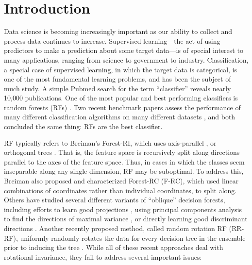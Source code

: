 \documentclass{article}
\begin{document}
\section{Introduction}
Data science is becoming increasingly important as our ability to collect and process data continues to increase. Supervised learning---the act of using predictors to make a prediction about some target data---is of special interest to many applications, ranging from science to government to industry. Classification, a special case of supervised learning, in which the target data is categorical, is one of the most fundamental learning problems, and has been the subject of much study. A simple Pubmed search for the term ``classifier'' reveals nearly 10,000 publications. One of the most popular and best performing classifiers is random forests (RFs) \cite{Breiman2001}. Two recent benchmark papers assess the performance of many different classification algorithms on many different datasets \cite{Delgado2014,Caruana2008}, and both concluded the same thing: RFs are the best classifier.


RF typically refers to Breiman's Forest-RI, which uses axis-parallel \cite{Heath1993}, or orthogonal trees \cite{Menze2011}. That is, the feature space is recursively split along directions parallel to the axes of the feature space. Thus, in cases in which the classes seem inseparable along any single dimension, RF may be suboptimal. To address this, Breiman also proposed and characterized Forest-RC (F-RC), which used linear combinations of coordinates rather than individual coordinates, to split along. Others have studied several different variants of ``oblique'' decision forests, including efforts to learn good projections \cite{Heath1993,Tan2005}, using principal components analysis to find the directions of maximal variance \cite{Ho1998,Rodriguez2006}, or directly learning good discriminant directions \cite{Menze2011}. Another recently proposed method, called random rotation RF (RR-RF), uniformly randomly rotates the data for every decision tree in the ensemble prior to inducing the tree \cite{Blaser2016}. While all of these recent approaches deal with rotational invariance, they fail to address several important issues:
\end{document}
